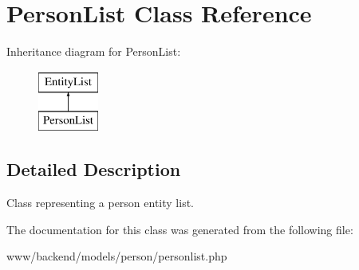 \hypertarget{classPersonList}{
\section{PersonList Class Reference}
\label{classPersonList}
}
Inheritance diagram for PersonList:\begin{figure}[H]
\begin{center}
\leavevmode
\includegraphics[height=2.000000cm]{classPersonList}
\end{center}
\end{figure}


\subsection{Detailed Description}
Class representing a person entity list. 

The documentation for this class was generated from the following file:\begin{DoxyCompactItemize}
\item 
www/backend/models/person/personlist.php\end{DoxyCompactItemize}
